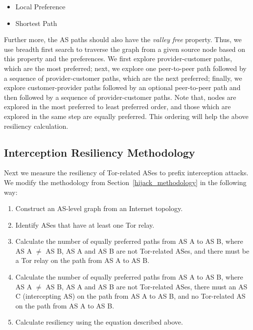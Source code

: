 \begin{itemize}
\item Local Preference
\item Shortest Path
\end{itemize}

Further more, the AS paths should also have the \emph{valley free} property. Thus, we use breadth first search to traverse the graph from a given source node based on this property and the preferences. We first explore provider-customer paths, which are the most preferred; next, we explore one peer-to-peer path followed by a sequence of provider-customer paths, which are the next preferred; finally, we explore customer-provider paths followed by an optional peer-to-peer path and then followed by a sequence of provider-customer paths. Note that, nodes are explored in the most preferred to least preferred order, and those which are explored in the same step are equally preferred. This ordering will help the above resiliency calculation. 



\subsection{Interception Resiliency Methodology}
Next we measure the resiliency of Tor-related ASes to prefix interception attacks.  We modify the methodology from Section~\ref{hijack_methodology} in the following way:

\begin{enumerate}
\item Construct an AS-level graph from an Internet topology.
\item Identify ASes that have at least one Tor relay.
\item Calculate the number of equally preferred paths from AS A to AS B, where AS A $\neq$ AS B, AS A and AS B are not Tor-related ASes, and there must be a Tor relay on the path from AS A to AS B.
\item Calculate the number of equally preferred paths from AS A to AS B, where AS A $\neq$ AS B, AS A and AS B are not Tor-related ASes, there must an AS C (intercepting AS) on the path from AS A to AS B, and no Tor-related AS on the path from AS A to AS B.
\item Calculate resiliency using the equation described above.
\end{enumerate}

